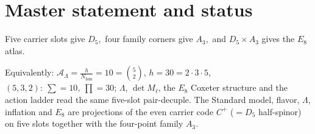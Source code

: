 \documentclass[11pt,a4paper]{article}
\newcommand{\Nfam}{N_{\mathrm{fam}}}
\newcommand{\AL}{\mathcal A_\Lambda}
\theoremstyle{definition}
\begin{document}
\section*{Master statement and status}
\begin{keyeq}
Five carrier slots give $D_5$,\ four family corners give $A_3$,\ and $D_5\times A_3$ gives the $E_8$ atlas.
\end{keyeq}
\noindent Equivalently: $\AL=\tfrac{h}{\Nfam}=10=\binom52$, $h=30=2\cdot3\cdot5$, $(5,3,2):\ \sum=10,\ \prod=30$;
$\Lambda$, $\det M_\ell$, the $E_8$ Coxeter structure and the action ladder read the same five-slot
pair-decuple. The Standard model, flavor, $\Lambda$, inflation and $E_8$ are projections of the
even carrier code $C^+$ ($=D_5$ half-spinor) on five slots together with the four-point family $A_3$.
\end{document}
